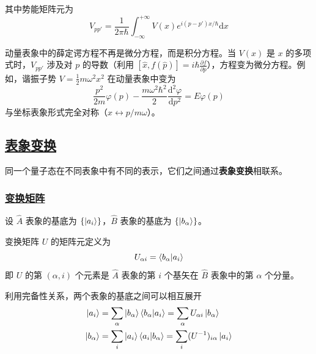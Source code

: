 其中势能矩阵元为
\begin{equation}
    V_{pp'} = \frac{1}{2\pi\hbar}\int_{-\infty}^{+\infty}V(x)e^{i(p-p')x/\hbar}\mathrm{d}x
\end{equation}

\begin{remark}
    动量表象中的薛定谔方程不再是微分方程，而是积分方程。当 $V(x)$ 是 $x$ 的多项式时，$V_{pp'}$ 涉及对 $p$ 的导数（利用 $[\hat{x}, f(\hat{p})] = i\hbar\frac{\partial f}{\partial p}$），方程变为微分方程。例如，谐振子势 $V = \frac{1}{2}m\omega^2 x^2$ 在动量表象中变为
    \begin{equation}
        \frac{p^2}{2m}\varphi(p) - \frac{m\omega^2\hbar^2}{2}\frac{\mathrm{d}^2\varphi}{\mathrm{d}p^2} = E\varphi(p)
    \end{equation}
    与坐标表象形式完全对称（$x \leftrightarrow p/m\omega$）。
\end{remark}

\subsection{\protect\hyperlink{:}{表象变换}}

同一个量子态在不同表象中有不同的表示，它们之间通过\textbf{表象变换}相联系。

\subsubsection{\protect\hyperlink{:}{变换矩阵}}

设 $\hat{A}$ 表象的基底为 $\{\ket{a_i}\}$，$\hat{B}$ 表象的基底为 $\{\ket{b_\alpha}\}$。

\begin{definition}[变换矩阵]
    变换矩阵 $U$ 的矩阵元定义为
    \begin{equation}
        U_{\alpha i} = \braket{b_\alpha}{a_i}
    \end{equation}
    即 $U$ 的第 $(\alpha, i)$ 个元素是 $\hat{A}$ 表象的第 $i$ 个基矢在 $\hat{B}$ 表象中的第 $\alpha$ 个分量。
\end{definition}

利用完备性关系，两个表象的基底之间可以相互展开
\begin{align}
    \ket{a_i} &= \sum_\alpha \ket{b_\alpha}\braket{b_\alpha}{a_i} = \sum_\alpha U_{\alpha i}\ket{b_\alpha} \\
    \ket{b_\alpha} &= \sum_i \ket{a_i}\braket{a_i}{b_\alpha} = \sum_i (U^{-1})_{i\alpha}\ket{a_i}
\end{align}

